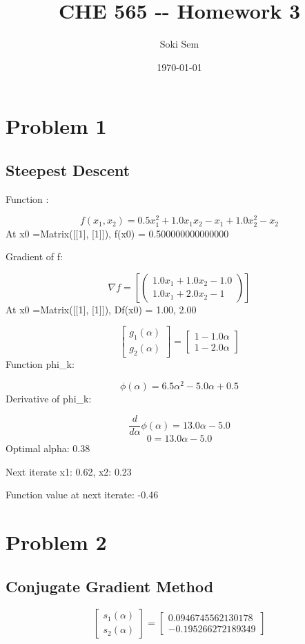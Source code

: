 \documentclass{article}%
\title{CHE 565 {-}{-} Homework 3}%
\author{Soki Sem}%
\date{\today}%
\begin{document}
%
\normalsize%
\setlength{\parindent}{0pt}%
\setlength{\parskip}{0.6em}%
\maketitle%
\section*{Problem 1}%
\label{sec:Problem1}%
\subsection*{Steepest Descent }%
\label{subsec:SteepestDescent}%
Function :%
\par%
\[%
f{\left(x_{1},x_{2} \right)} = 0.5 x_{1}^{2} + 1.0 x_{1} x_{2} - x_{1} + 1.0 x_{2}^{2} - x_{2}%
\]%
At x0 =Matrix({[}{[}1{]}, {[}1{]}{]}), f(x0) = 0.500000000000000%
\par%
Gradient of f:%
\par%
\[%
\nabla f = \left[\begin{pmatrix}1.0 x_{1} + 1.0 x_{2} - 1.0\\1.0 x_{1} + 2.0 x_{2} - 1\end{pmatrix}\right]%
\]%
At x0 =Matrix({[}{[}1{]}, {[}1{]}{]}), Df(x0) = 1.00, 2.00%
\par%
\[%
\left[\begin{matrix}g_{1}{\left(\alpha \right)}\\g_{2}{\left(\alpha \right)}\end{matrix}\right] = \left[\begin{matrix}1 - 1.0 \alpha\\1 - 2.0 \alpha\end{matrix}\right]%
\]%
Function phi\_k:%
\par%
\[%
\phi{\left(\alpha \right)} = 6.5 \alpha^{2} - 5.0 \alpha + 0.5%
\]%
Derivative of phi\_k:%
\par%
\[%
\frac{d}{d \alpha} \phi{\left(\alpha \right)} = 13.0 \alpha - 5.0%
\]%
\[%
0 = 13.0 \alpha - 5.0%
\]%
Optimal alpha: 0.38%
\par%
Next iterate x1: 0.62, x2: 0.23%
\par%
Function value at next iterate: {-}0.46%
\par

%
\section*{Problem 2}%
\label{sec:Problem2}%
\subsection*{Conjugate Gradient Method}%
\label{subsec:ConjugateGradientMethod}%
\[%
\left[\begin{matrix}s_{1}{\left(\alpha \right)}\\s_{2}{\left(\alpha \right)}\end{matrix}\right] = \left[\begin{matrix}0.0946745562130178\\-0.195266272189349\end{matrix}\right]%
\]
\end{document}
